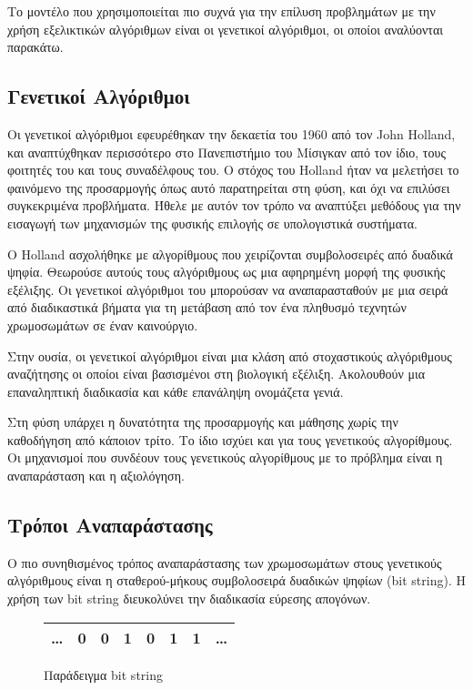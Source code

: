 Το μοντέλο που χρησιμοποιείται πιο συχνά για την επίλυση προβλημάτων με την χρήση εξελικτικών αλγόριθμων είναι οι γενετικοί αλγόριθμοι, οι οποίοι αναλύονται παρακάτω.

\subsection{Γενετικοί Αλγόριθμοι}

Οι γενετικοί αλγόριθμοι εφευρέθηκαν την δεκαετία του 1960 από τον John Holland, και αναπτύχθηκαν περισσότερο στο Πανεπιστήμιο του Μίσιγκαν από τον ίδιο, τους φοιτητές του και τους συναδέλφους του. Ο στόχος του Holland ήταν να μελετήσει το φαινόμενο της προσαρμογής όπως αυτό παρατηρείται στη φύση, και όχι να επιλύσει συγκεκριμένα προβλήματα. Ήθελε με αυτόν τον τρόπο να αναπτύξει μεθόδους για την εισαγωγή των μηχανισμών της φυσικής επιλογής σε υπολογιστικά συστήματα. \cite{Melanie1999}

O Holland ασχολήθηκε με αλγορίθμους που χειρίζονται συμβολοσειρές από δυαδικά ψηφία. Θεωρούσε αυτούς τους αλγόριθμους ως μια αφηρημένη μορφή της φυσικής εξέλιξης. Οι γενετικοί αλγόριθμοι του μπορούσαν να αναπαρασταθούν με μια σειρά από διαδικαστικά βήματα για τη μετάβαση από τον ένα πληθυσμό τεχνητών χρωμοσωμάτων σε έναν καινούργιο.

Στην ουσία, οι γενετικοί αλγόριθμοι είναι μια κλάση από στοχαστικούς αλγόριθμους αναζήτησης οι οποίοι είναι βασισμένοι στη βιολογική εξέλιξη. Ακολουθούν μια επαναληπτική διαδικασία και κάθε επανάληψη ονομάζετα γενιά.

Στη φύση υπάρχει η δυνατότητα της προσαρμογής και μάθησης χωρίς την καθοδήγηση από κάποιον τρίτο. Το ίδιο ισχύει και για τους γενετικούς αλγορίθμους. Οι μηχανισμοί που συνδέουν τους γενετικούς αλγορίθμους με το πρόβλημα είναι η αναπαράσταση και η αξιολόγηση.

\subsection{Τρόποι Αναπαράστασης}

Ο πιο συνηθισμένος τρόπος αναπαράστασης των χρωμοσωμάτων στους γενετικούς αλγόριθμους είναι η σταθερού-μήκους συμβολοσειρά δυαδικών ψηφίων (bit string). Η χρήση των bit string διευκολύνει την διαδικασία εύρεσης απογόνων.

\begin{figure}[!t]
    \renewcommand{\arraystretch}{1.3}
    \label{fig_bit_string}
    \centering
    \begin{tabular}{c|c|c|c|c|c|c|c}
        \hline
        \ldots & 0 & 0 & 1 & 0 & 1 & 1 & \ldots\\
        \hline
    \end{tabular}
    \caption{Παράδειγμα bit string}
\end{figure}

